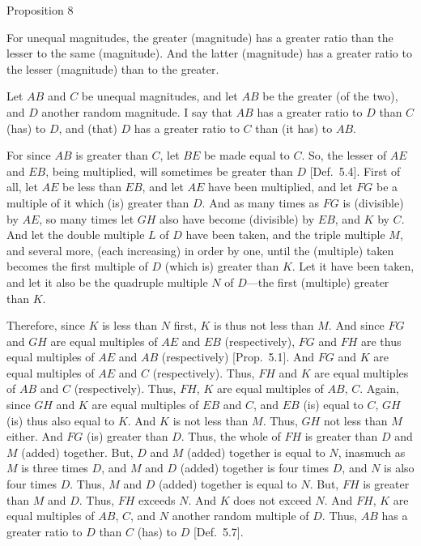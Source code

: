 
\begin{center}
{\large Proposition 8}
\end{center}

For unequal magnitudes, the greater (magnitude) has a greater
ratio  than the lesser to the same (magnitude). And the latter (magnitude)
has a greater ratio to the lesser (magnitude) than to the greater.

Let $AB$ and $C$ be unequal magnitudes, and let $AB$ be the greater (of the two),
and $D$ another random magnitude. I say that $AB$ has a greater ratio to $D$
than  $C$ (has) to $D$, and (that) $D$ has a greater ratio to $C$ than (it has) to $AB$.

\epsfysize=1.8in
\centerline{}

For since $AB$ is greater than $C$, let $BE$ be made equal to $C$.
So, the lesser of $AE$ and $EB$, being multiplied, will sometimes be greater than $D$ [Def.~5.4]. First of all, let $AE$ be less than $EB$, and let $AE$ have been multiplied, 
and let $FG$ be a multiple of it which (is) greater than $D$.
And as many times as $FG$ is (divisible) by $AE$, so many times
let $GH$ also have become (divisible) by $EB$, and $K$ by $C$. And
let the double multiple $L$ of $D$ have been taken, and the triple
multiple $M$, and several more, (each increasing) in order by one,
until the (multiple) taken  becomes the first multiple of $D$ (which is) greater than $K$. Let it have been taken, and let it also be the quadruple multiple
$N$ of $D$---the first (multiple) greater than $K$.

Therefore, since $K$ is less than $N$ first, $K$ is thus not less than $M$.
And since $FG$ and $GH$ are equal multiples of $AE$ and $EB$ (respectively),
$FG$ and $FH$ are thus equal multiples of $AE$ and $AB$ (respectively) [Prop.~5.1].
And $FG$ and $K$ are equal multiples of $AE$ and $C$ (respectively).
Thus, $FH$ and $K$ are equal multiples of $AB$ and $C$ (respectively).
Thus, $FH$, $K$ are equal multiples of $AB$, $C$. Again, since $GH$ and 
$K$ are equal
multiples of $EB$ and $C$, and $EB$ (is) equal to $C$, $GH$ (is) thus also equal to
$K$. And $K$ is not less than $M$. Thus, $GH$ not less than $M$ either. And $FG$
(is) greater than $D$. Thus, the whole of $FH$ is greater than $D$
and $M$ (added) together. But, $D$ and $M$ (added) together is equal to $N$, 
inasmuch as $M$ is three times $D$, and $M$ and $D$ (added) together is four
times $D$, and $N$ is also four times $D$. Thus, $M$ and $D$ (added) together is
equal to $N$. But, $FH$ is greater than $M$ and $D$. Thus, $FH$ exceeds $N$. And $K$ does not exceed $N$. 
And $FH$, $K$  are equal multiples of $AB$, $C$, and $N$ another random multiple
of $D$. Thus, $AB$ has a greater ratio to $D$  than $C$ (has) to $D$ [Def.~5.7].

